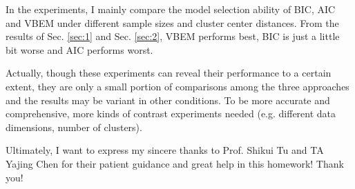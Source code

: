 \documentclass[12pt,a4paper]{article}
\theoremstyle{definition}
\begin{document}
In the experiments, I mainly compare the model selection ability of BIC, AIC and VBEM under different sample sizes and cluster center distances. From the results of Sec. \ref{sec:1} and Sec. \ref{sec:2}, VBEM performs best, BIC is just a little bit worse and AIC performs worst.

Actually, though these experiments can reveal their performance to a certain extent, they are only a small portion of comparisons among the three approaches and the results may be variant in other conditions. To be more accurate and comprehensive, more kinds of contrast experiments needed (e.g. different data dimensions, number of clusters).

Ultimately, I want to express my sincere thanks to Prof. Shikui Tu and TA Yajing Chen for their patient guidance and great help in this homework! Thank you!

\end{document}
